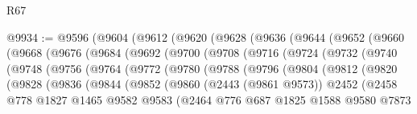\begin{lexlean}{R67}
\begin{coremodule}
@9934 := @9596
    (@9604
      (@9612
        (@9620
          (@9628
            (@9636
              (@9644
                (@9652
                  (@9660
                    (@9668
                      (@9676
                        (@9684
                          (@9692
                            (@9700
                              (@9708
                                (@9716
                                  (@9724
                                    (@9732
                                      (@9740
                                        (@9748
                                          (@9756
                                            (@9764
                                              (@9772
                                                (@9780
                                                  (@9788
                                                    (@9796
                                                      (@9804
                                                        (@9812
                                                          (@9820
                                                            (@9828
                                                              (@9836
                                                                (@9844
                                                                  (@9852
                                                                    (@9860
                                                                      (@2443 (@9861 @9573))
                                                                      @2452
                                                                      (@2458
                                                                        @778
                                                                        @1827
                                                                        @1465
                                                                        @9582
                                                                        @9583
                                                                        (@2464
                                                                          @776
                                                                          @687
                                                                          @1825
                                                                          @1588
                                                                          @9580
                                                                          @7873

\end{coremodule}
\end{lexlean}
